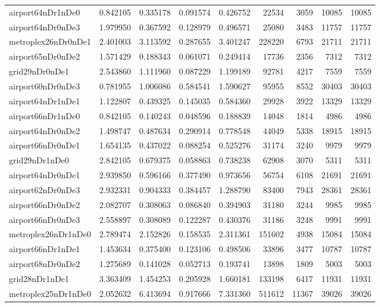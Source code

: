 \begin{longtable}{|l|r|r|r|r|r|r|r|r|}
airport64nDr1nDe0 & 0.842105 & 0.335178 & 0.091574 & 0.426752 & 22534 & 3059 & 10085 & 10085 \\
airport64nDr0nDe3 & 1.979950 & 0.367592 & 0.128979 & 0.496571 & 25080 & 3483 & 11757 & 11757 \\
metroplex26nDr0nDe1 & 2.401003 & 3.113592 & 0.287655 & 3.401247 & 228220 & 6793 & 21711 & 21711 \\
airport65nDr0nDe2 & 1.571429 & 0.188343 & 0.061071 & 0.249414 & 17736 & 2356 & 7312 & 7312 \\
grid29nDr0nDe1 & 2.543860 & 1.111960 & 0.087229 & 1.199189 & 92781 & 4217 & 7559 & 7559 \\
airport60nDr0nDe3 & 0.781955 & 1.006086 & 0.584541 & 1.590627 & 95955 & 8552 & 30403 & 30403 \\
airport64nDr1nDe1 & 1.122807 & 0.439325 & 0.145035 & 0.584360 & 29928 & 3922 & 13329 & 13329 \\
airport66nDr1nDe0 & 0.842105 & 0.140243 & 0.048596 & 0.188839 & 14048 & 1814 & 4986 & 4986 \\
airport64nDr0nDe2 & 1.498747 & 0.487634 & 0.290914 & 0.778548 & 44049 & 5338 & 18915 & 18915 \\
airport66nDr0nDe1 & 1.654135 & 0.437022 & 0.088254 & 0.525276 & 31174 & 3240 & 9979 & 9979 \\
grid29nDr1nDe0 & 2.842105 & 0.679375 & 0.058863 & 0.738238 & 62908 & 3070 & 5311 & 5311 \\
airport64nDr0nDe1 & 2.939850 & 0.596166 & 0.377490 & 0.973656 & 56754 & 6108 & 21691 & 21691 \\
airport62nDr0nDe3 & 2.932331 & 0.904333 & 0.384457 & 1.288790 & 83400 & 7943 & 28361 & 28361 \\
airport66nDr0nDe2 & 2.082707 & 0.308063 & 0.086840 & 0.394903 & 31180 & 3244 & 9985 & 9985 \\
airport66nDr0nDe3 & 2.558897 & 0.308089 & 0.122287 & 0.430376 & 31186 & 3248 & 9991 & 9991 \\
metroplex26nDr1nDe0 & 2.789474 & 2.152826 & 0.158535 & 2.311361 & 151602 & 4938 & 15084 & 15084 \\
airport66nDr1nDe1 & 1.453634 & 0.375400 & 0.123106 & 0.498506 & 33896 & 3477 & 10787 & 10787 \\
airport68nDr0nDe2 & 1.275689 & 0.141028 & 0.052713 & 0.193741 & 13898 & 1809 & 5003 & 5003 \\
grid28nDr1nDe1 & 3.363409 & 1.454253 & 0.205928 & 1.660181 & 133198 & 6417 & 11931 & 11931 \\
metroplex25nDr1nDe0 & 2.052632 & 6.413694 & 0.917666 & 7.331360 & 511612 & 11367 & 39026 & 39026 \\

\end{longtable}
